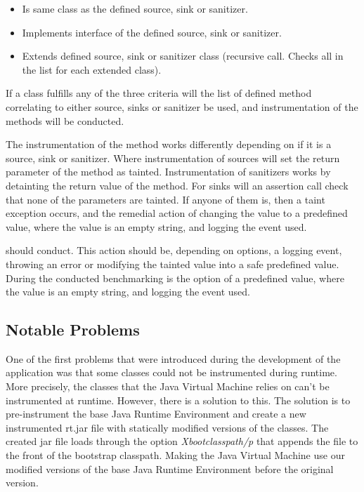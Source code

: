 \begin{itemize}
    \item Is same class as the defined source, sink or sanitizer.
    \item Implements interface of the defined source, sink or sanitizer.
    \item Extends defined source, sink or sanitizer class (recursive call. Checks all in the list for each extended class). 
\end{itemize}
\hfill

If a class fulfills any of the three criteria will the list of defined method correlating to either source, sinks or sanitizer be used, and instrumentation of the methods will be conducted.

The instrumentation of the method works differently depending on if it is a source, sink or sanitizer. Where instrumentation of sources will set the return parameter of the method as tainted. Instrumentation of sanitizers works by detainting the return value of the method. For sinks will an assertion call check that none of the parameters are tainted. If anyone of them is, then a taint exception occurs, and the remedial action of changing the value to a predefined value, where the value is an empty string, and logging the event used.

should conduct. This action should be, depending on options, a logging event, throwing an error or modifying the tainted value into a safe predefined value. During the conducted benchmarking is the option of a predefined value, where the value is an empty string, and logging the event used.



\subsection{Notable Problems}
\label{NotableProblems}
One of the first problems that were introduced during the development of the application was that some classes could not be instrumented during runtime. More precisely, the classes that the Java Virtual Machine relies on can't be instrumented at runtime. However, there is a solution to this. The solution is to pre-instrument the base Java Runtime Environment and create a new instrumented rt.jar file with statically modified versions of the classes. The created jar file loads through the option \textit{Xbootclasspath/p} that appends the file to the front of the bootstrap classpath. Making the Java Virtual Machine use our modified versions of the base Java Runtime Environment \parencite{xboot} before the original version.

